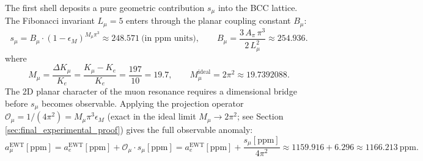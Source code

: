 \documentclass[10pt,a4paper]{article}
\begin{document}
The first shell deposits a pure geometric contribution $s_\mu$ into the BCC
lattice. The Fibonacci invariant $L_\mu = 5$ enters through the planar
coupling constant $B_\mu$:
\begin{equation}
	s_{\mu}
	= B_{\mu}\cdot(1-\epsilon_M)^{M_{\mu}\pi^{3}}
	\approx 248.571\ \text{(in ppm units)},
	\qquad
	B_{\mu} = \frac{3\,A_{\pi}\,\pi^{3}}{2\,L_{\mu}^{2}} \approx 254.936.
	\label{eq:s_mu}
\end{equation}
where
\begin{equation}
	M_{\mu}
	= \frac{\Delta K_{\mu}}{K_e}
	= \frac{K_{\mu}-K_e}{K_e}
	= \frac{197}{10}
	= 19.7,
	\qquad
	M_{\mu}^{\mathrm{ideal}} = 2\pi^{2} \approx 19.7392088.
\end{equation}
The 2D planar character of the muon resonance requires a dimensional bridge
before $s_\mu$ becomes observable. Applying the projection operator
$\mathcal{O}_\mu = 1/(4\pi^2) = M_\mu\pi^3\epsilon_M$ (exact in the ideal
limit $M_\mu \to 2\pi^2$; see Section \ref{sec:final_experimental_proof})
gives the full observable anomaly:
\begin{equation}
	a_{\mu}^{\text{EWT}}[\text{ppm}]
	= a_e^{\text{EWT}}[\text{ppm}]
	+ \mathcal{O}_{\mu}\cdot s_{\mu}[\text{ppm}]
	= a_e^{\text{EWT}}[\text{ppm}]
	+ \frac{s_{\mu}[\text{ppm}]}{4\pi^{2}}
	\approx 1159.916 + 6.296
	\approx 1166.213\ \text{ppm}.
	\label{eq:amu_master}
\end{equation}
\end{document}
